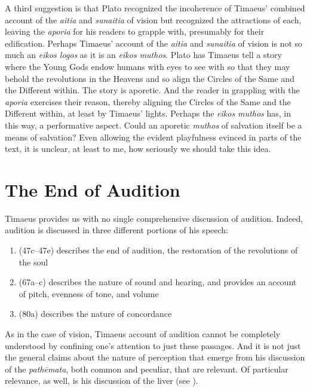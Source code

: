 A third suggestion is that Plato recognized the incoherence of Timaeus' combined account of the \emph{aitia} and \emph{sunaitia} of vision but recognized the attractions of each, leaving the \emph{aporia} for his readers to grapple with, presumably for their edification. Perhaps Timaeus' account of the \emph{aitia} and \emph{sunaitia} of vision is not so much an \emph{eikos logos} as it is an \emph{eikos muthos}. Plato has Timaeus tell a story where the Young Gods endow humans with eyes to see with so that they may behold the revolutions in the Heavens and so align the Circles of the Same and the Different within. The story is aporetic. And the reader in grappling with the \emph{aporia} exercises their reason, thereby aligning the Circles of the Same and the Different within, at least by Timaeus' lights. Perhaps the \emph{eikos muthos} has, in this way, a performative aspect. Could an aporetic \emph{muthos} of salvation itself be a means of salvation? Even allowing the evident playfulness evinced in parts of the text, it is unclear, at least to me, how seriously we should take this idea.



\section{The End of Audition} %
\label{sec:the_end_of_audition}

Timaeus provides us with no single comprehensive discussion of audition. Indeed, audition is discussed in three different portions of his speech:
\begin{enumerate}[(1)]
	\item (47c–47e) describes the end of audition, the restoration of the revolutions of the soul
	\item (67a–c) describes the nature of sound and hearing, and provides an account of pitch, evenness of tone, and volume
	\item (80a) describes the nature of concordance
\end{enumerate}
As in the case of vision, Timaeus account of audition cannot be completely understood by confining one's attention to just these passages. And it is not just the general claims about the nature of perception that emerge from his discussion of the \emph{pathēmata}, both common and peculiar, that are relevant. Of particular relevance, as well, is his discussion of the liver (see \citealt{Barker:2000dy}).

